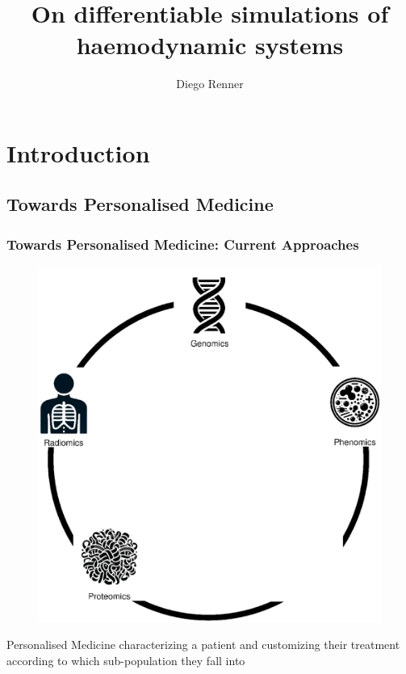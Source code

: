 \documentclass[compress]{beamer}
\title{On differentiable simulations of \\ haemodynamic systems}
\author{Diego Renner}
\begin{document}
\section{Introduction}
\subsection{Towards Personalised Medicine}
\maketitle
\begin{frame}
	\frametitle{Towards Personalised Medicine: Current Approaches}
	\begin{minipage}{0.59\textwidth}
		\begin{figure}[H]
			\includegraphics[width=\textwidth]{images/approaches_current.eps}
		\end{figure}
	\end{minipage} 
	\begin{minipage}{0.39\textwidth}
		\begin{minipage}[t][0.41\paperheight][t]{\textwidth}
			\begin{block}{Personalised Medicine}
				characterizing a patient and customizing their treatment according to which sub-population they fall into	
			\end{block}
		\end{minipage}
		\begin{minipage}[t][0.41\paperheight][t]{\textwidth}
		\end{minipage}
	\end{minipage}
\end{frame}
\end{document}
